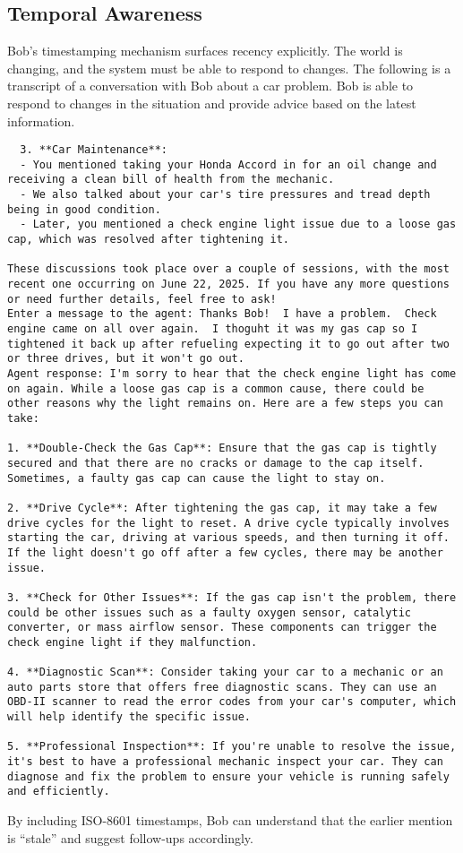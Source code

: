 \documentclass[11pt]{article}
\begin{document}
\subsection{Temporal Awareness}
Bob’s timestamping mechanism surfaces recency explicitly. The world is changing, and the system must be able to respond to changes.  The following is a transcript of a conversation with Bob about a car problem.  Bob is able to respond to changes in the situation and provide advice based on the latest information.
\begin{verbatim}
  3. **Car Maintenance**:
  - You mentioned taking your Honda Accord in for an oil change and receiving a clean bill of health from the mechanic.
  - We also talked about your car's tire pressures and tread depth being in good condition.
  - Later, you mentioned a check engine light issue due to a loose gas cap, which was resolved after tightening it.

These discussions took place over a couple of sessions, with the most recent one occurring on June 22, 2025. If you have any more questions or need further details, feel free to ask!
Enter a message to the agent: Thanks Bob!  I have a problem.  Check engine came on all over again.  I thoguht it was my gas cap so I tightened it back up after refueling expecting it to go out after two or three drives, but it won't go out.
Agent response: I'm sorry to hear that the check engine light has come on again. While a loose gas cap is a common cause, there could be other reasons why the light remains on. Here are a few steps you can take:

1. **Double-Check the Gas Cap**: Ensure that the gas cap is tightly secured and that there are no cracks or damage to the cap itself. Sometimes, a faulty gas cap can cause the light to stay on.

2. **Drive Cycle**: After tightening the gas cap, it may take a few drive cycles for the light to reset. A drive cycle typically involves starting the car, driving at various speeds, and then turning it off. If the light doesn't go off after a few cycles, there may be another issue.

3. **Check for Other Issues**: If the gas cap isn't the problem, there could be other issues such as a faulty oxygen sensor, catalytic converter, or mass airflow sensor. These components can trigger the check engine light if they malfunction.

4. **Diagnostic Scan**: Consider taking your car to a mechanic or an auto parts store that offers free diagnostic scans. They can use an OBD-II scanner to read the error codes from your car's computer, which will help identify the specific issue.

5. **Professional Inspection**: If you're unable to resolve the issue, it's best to have a professional mechanic inspect your car. They can diagnose and fix the problem to ensure your vehicle is running safely and efficiently.

\end{verbatim}
By including ISO-8601 timestamps, Bob can understand that the earlier mention is “stale” and suggest follow-ups accordingly.
\end{document}
